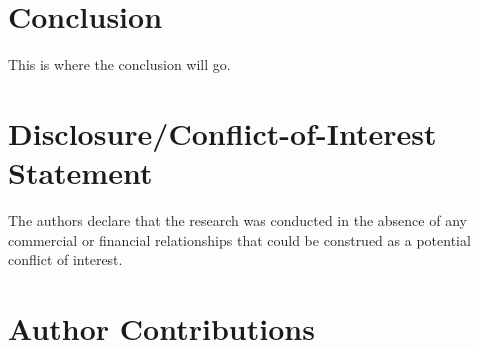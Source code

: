\documentclass{frontiersSCNS} %
\begin{document}
\section{Conclusion}
This is where the conclusion will go.

\section*{Disclosure/Conflict-of-Interest Statement}

The authors declare that the research was conducted in the absence of any commercial or financial relationships that could be construed as a potential conflict of interest.



\section*{Author Contributions}
\end{document}
